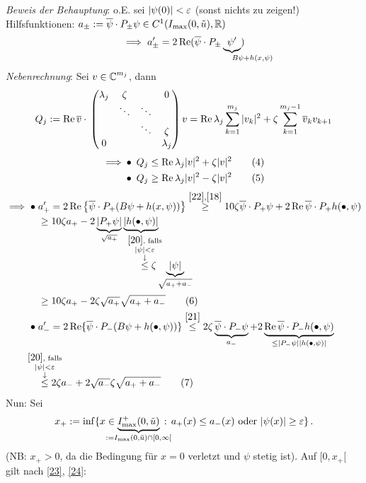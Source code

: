 \documentclass[a4paper]{article}
\begin{document}
\begin{Beweis}
\textit{Beweis der Behauptung}: o.E. sei $|\psi(0)|<\operatorname{\varepsilon}$ (sonst nichts zu zeigen!)\\
Hilfsfunktionen: $a_{\pm}:=\overline{\psi}\cdot P_{\pm}\psi\in C^1(I_{\max}(0,\tilde{u}),\mathbb R)$
\[\implies a_{\pm}'=2\Rea(\overline{\psi}\cdot P_{\pm}\underbrace{\psi'}_{\mathrlap{B\psi+h(x,\psi)}})\]
\textit{Nebenrechnung}: Sei $v\in \operatorname{\mathbb C}^{m_j}$, dann
\[Q_j:=\operatorname{\textrm{Re}}\overline{v}\cdot\mathop{}\begin{pmatrix}\lambda_j&\zeta&&0\\&\ddots&\ddots&\\&&\ddots&\zeta\\0&&&\lambda_j\end{pmatrix}v=\operatorname{\textrm{Re}}\lambda_j\sum_{k=1}^{m_j}|v_k|^2+\zeta\sum_{k=1}^{m_j-1}\overline{v}_kv_{k+1}\]
\begin{align*}
\implies&\bullet\;Q_j\le\operatorname{\textrm{Re}}\lambda_j|v|^2+\zeta|v|^2\tag{$4$}\label{21}\\
&\bullet\; Q_j\ge \operatorname{\textrm{Re}}\lambda_j|v|^2-\zeta|v|^2\tag{$5$}\label{22}
\end{align*}
\begin{align*}
\implies\bullet\;& 
a_+'=2\Rea\left\{ \overline{\psi}\cdot P_+(B\psi+h(x,\psi))\right\}\overset{\eqref{22},\eqref{18}}{\ge }10\zeta\overline{\psi}\cdot P_+\psi+2\Rea\overline{\psi}\cdot P_+h(\bullet,\psi)\\
&\ge 10\zeta a_+-2\underbrace{|P_+\psi|}_{\sqrt{a_+}}\underbrace{|h(\bullet,\psi)|}_{\mathrlap{\displaystyle
\overset{\mathclap{\substack{\eqref{20}\text{, falls}\\ |\psi|<\ve\\\downarrow}}}{\le}\zeta\underbrace{|\psi|}_{\sqrt{a_++a_-}}}
}\\
&\ge 10\zeta a_+-2\zeta\sqrt{a_+}\sqrt{a_++a_-}\tag{$6$}\label{23}\\
\bullet\;& a_-'=2\Rea\{\overline{\psi}\cdot P_-(B\psi+h(\bullet,\psi))\}\overset{\eqref{21}}{\le }2\zeta\underbrace{\overline{\psi}\cdot P_-\psi}_{a_-}+2\underbrace{\Rea\overline{\psi}\cdot P_-h(\bullet,\psi)}_{\le|P_-\psi||h(\bullet,\psi)|}\\
&\overset{\mathclap{\substack{\eqref{20}\text{, falls}\\ |\psi|<\ve\\\downarrow}}}{\le} 2\zeta a_-+2\sqrt{a_-}\zeta\sqrt{a_++a_-}\tag{$7$}\label{24}
\end{align*}
Nun: Sei 
\[x_+:=\inf\{x\in \underbrace{I_{\max}^+(0,\tilde{u})}_{\mathclap{:=I_{\max}(0,\tilde{u})\cap[0,\infty[}}\,:\,a_+(x)\le a_-(x)\te{oder }|\psi(x)|\ge \ve\}\,.\]
(NB: $x_+>0$, da die Bedingung für $x=0$ verletzt und $\psi$ stetig ist). Auf $[0,x_+[$ gilt nach \eqref{23}, \eqref{24}:

\end{Beweis}
\end{document}
